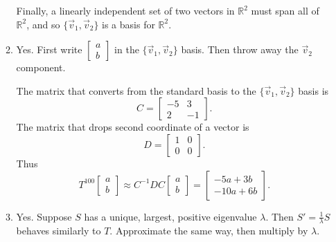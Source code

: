 \documentclass[red]{tutorial}
\newcommand{\R}{\mathbb{R}}
\newcommand{\mat}[1]{\begin{bmatrix}#1\end{bmatrix}}
\theoremstyle{definition}
\theoremstyle{theorem}
\begin{document}
\begin{solutions}
\begin{enumerate}
\begin{enumerate}
					Finally, a linearly independent set of two vectors in $\R^2$ must span all of $\R^2$,
					and so $\{\vec v_1,\vec v_2\}$ is a basis for $\R^2$.
				\item Yes. First write $\mat{a\\b}$ in the $\{\vec v_1,\vec v_2\}$ basis. Then throw away
					the $\vec v_2$ component.

					The matrix that converts from the standard basis to the $\{\vec v_1,\vec v_2\}$ basis is
					\[
						C=\mat{-5&3\\2&-1}.
					\]
					The matrix that drops second coordinate of a vector is
					\[
						D=\mat{1&0\\0&0}.
					\]
					Thus
					\[
						T^{100}\mat{a\\b} \approx C^{-1}DC\mat{a\\b}=\mat{-5a+3b\\-10a+6b}.
					\]
				\item Yes. Suppose $S$ has a unique, largest, positive eigenvalue $\lambda$. Then $S'=\tfrac{1}{\lambda}S$
					behaves similarly to $T$. Approximate the same way, then multiply by $\lambda$.
			\end{enumerate}
		\end{enumerate}
	\end{solutions}
\end{document}
